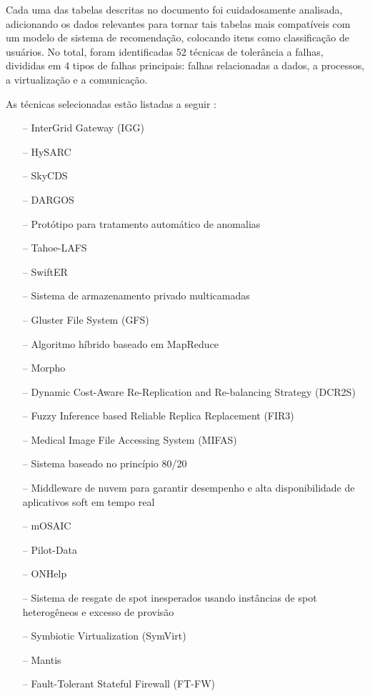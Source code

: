 \documentclass[
	12pt,				%
	oneside,			%
	a4paper,			%
	chapter=TITLE,		%
	english,			%
	french,				%
	spanish,			%
	brazil				%
	]{abntex2}
\begin{document}
Cada uma das tabelas descritas no documento foi cuidadosamente analisada, adicionando os dados relevantes para tornar tais tabelas mais compatíveis com um modelo de sistema de recomendação, colocando itens como classificação de usuários. No total, foram identificadas 52 técnicas de tolerância a falhas, divididas em 4 tipos de falhas principais: falhas relacionadas a dados, a processos, a virtualização e a comunicação.

As técnicas selecionadas estão listadas a seguir \cite{andrade2019taxonomia}:

\begin{multicols}{2}
\begin{itemize}
    \item[--] InterGrid Gateway (IGG)
    \item[--] HySARC
    \item[--] SkyCDS
    \item[--] DARGOS
    \item[--] Protótipo para tratamento automático de anomalias
    \item[--] Tahoe-LAFS
    \item[--] SwiftER
    \item[--] Sistema de armazenamento privado multicamadas
    \item[--] Gluster File System (GFS)
    \item[--] Algoritmo híbrido baseado em MapReduce
    \item[--] Morpho
    \item[--] Dynamic Cost-Aware Re-Replication and Re-balancing Strategy (DCR2S)
    \item[--] Fuzzy Inference based Reliable Replica Replacement (FIR3)
    \item[--] Medical Image File Accessing System (MIFAS)
    \item[--] Sistema baseado no princípio 80/20
    \item[--] Middleware de nuvem para garantir desempenho e alta disponibilidade de aplicativos soft em tempo real
    \item[--] mOSAIC
    \item[--] Pilot-Data
    \item[--] ONHelp
    \item[--] Sistema de resgate de spot inesperados usando instâncias de spot heterogêneos e excesso de provisão
    \item[--] Symbiotic Virtualization (SymVirt)
    \item[--] Mantis
    \item[--] Fault-Tolerant Stateful Firewall (FT-FW)

\end{itemize}
\end{multicols}
\end{document}
